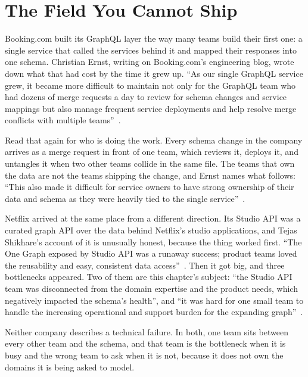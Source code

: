 \section{The Field You Cannot Ship}
\label{sec:ch01-the-field-you-cannot-ship}

%
Booking.com built its GraphQL layer the way many teams build their first one:
a single service that called the services behind it and mapped their responses
into one schema. Christian Ernst, writing on Booking.com's engineering blog,
wrote down what that had cost by the time it grew up. \enquote{As our single
GraphQL service grew, it became more difficult to maintain not only for the
GraphQL team who had dozens of merge requests a day to review for schema
changes and service mappings but also manage frequent service deployments and
help resolve merge conflicts with multiple teams}~\autocite{ernst2022}.

Read that again for who is doing the work. Every schema change in the company
arrives as a merge request in front of one team, which reviews it, deploys it,
and untangles it when two other teams collide in the same file. The teams that
own the data are not the teams shipping the change, and Ernst names what
follows: \enquote{This also made it difficult for service owners to have strong
ownership of their data and schema as they were heavily tied to the single
service}~\autocite{ernst2022}.

Netflix arrived at the same place from a different direction. Its Studio API
was a curated graph API over the data behind Netflix's studio applications, and
Tejas Shikhare's account of it is unusually honest, because the thing worked
first. \enquote{The One Graph exposed by Studio API was a runaway success;
product teams loved the reusability and easy, consistent data
access}~\autocite{shikhare2020}. Then it got big, and three bottlenecks
appeared. Two of them are this chapter's subject: \enquote{the Studio API team
was disconnected from the domain expertise and the product needs, which
negatively impacted the schema's health}, and \enquote{it was hard for one
small team to handle the increasing operational and support burden for the
expanding graph}~\autocite{shikhare2020}.

Neither company describes a technical failure. In both, one team sits between
every other team and the schema, and that team is the bottleneck when it is
busy and the wrong team to ask when it is not, because it does not own the
domains it is being asked to model.

